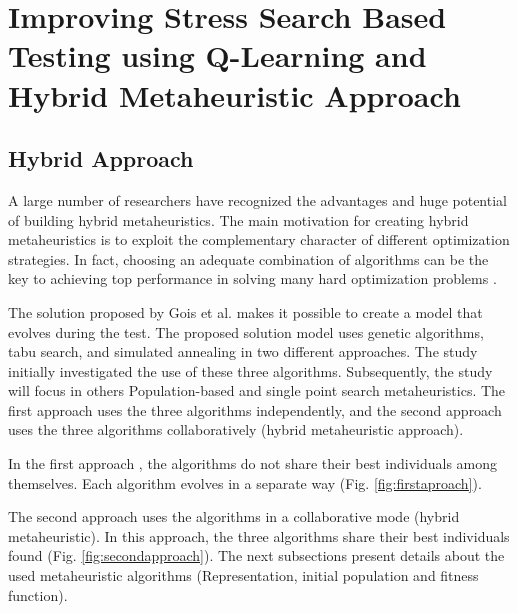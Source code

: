 \section{Improving Stress Search Based Testing using Q-Learning and Hybrid Metaheuristic Approach}


\subsection{Hybrid Approach}

A large number of researchers have recognized the advantages and huge potential of building hybrid metaheuristics. The main motivation for creating hybrid metaheuristics is to exploit the complementary character of different optimization strategies. In fact, choosing an adequate combination of algorithms can be the key to achieving top performance in solving many hard optimization problems \cite{Puchinger2005} \cite{Blum2012}.

The solution proposed by Gois et al. \cite{Gois2016} makes it possible to create a model that evolves during the test. The proposed solution model uses genetic algorithms, tabu search, and simulated annealing in two different approaches. The study initially investigated the use of these three algorithms. Subsequently, the study will focus in others Population-based and single point search metaheuristics. The first approach uses the three algorithms independently, and the second approach uses the three algorithms collaboratively (hybrid metaheuristic approach).

In the first approach , the algorithms do not share their best individuals among themselves. Each algorithm evolves in a separate way (Fig. \ref{fig:firstaproach}).





The second approach uses the algorithms in a collaborative mode (hybrid metaheuristic). In this approach, the three algorithms share their best individuals found (Fig. \ref{fig:secondapproach}). The next subsections present details about the used metaheuristic algorithms (Representation, initial population and fitness function).


